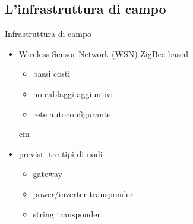 \documentclass{beamer}
\newcommand{\N}{\vskip 0.3 cm}
\newcommand{\red}[1]{\textcolor[rgb]{.8,0,0}{#1}}
\begin{document}
%
\subsection{L'infrastruttura di campo}
\begin{frame}{Infrastruttura di campo}
%
\begin{itemize}
  \item \red{Wireless Sensor Network} (WSN) ZigBee-based
    \begin{itemize}
    \item bassi costi
    \item no cablaggi aggiuntivi
    \item rete autoconfigurante
    \end{itemize}
    \N
  \item previsti tre tipi di nodi
    \begin{itemize}
    \item \red{gateway}
    \item \red{power/inverter transponder}
    \item \red{string transponder}
    \end{itemize}
\end{itemize}
%
\end{frame}
%
\end{document}
